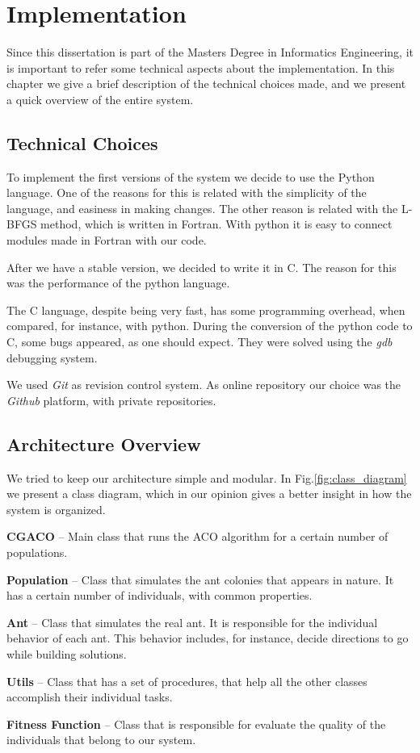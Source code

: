 \chapter{Implementation}

Since this dissertation is part of the Masters Degree in Informatics Engineering, it is important to refer some technical aspects about the implementation. In this chapter we give a brief description of the technical choices made, and we present a quick overview of the entire system.

\section{Technical Choices}

To implement the first versions of the system we decide to use the Python language. One of the reasons for this is related with the simplicity of the language, and easiness in making changes. The other reason is related with the L-BFGS method, which is written in Fortran. With python it is easy to connect modules made in Fortran with our code.

After we have a stable version, we decided to write it in C. The reason for this was the performance of the python language. 

The C language, despite being very fast, has some programming overhead, when compared, for instance, with python. During the conversion of the python code to C, some bugs appeared, as one should expect. They were solved using the \emph{gdb} debugging system.

We used \emph{Git} as revision control system. As online repository our choice was the \emph{Github} platform, with private repositories.

\section{Architecture Overview}
We tried to keep our architecture simple and modular. In Fig.\ref{fig:class_diagram} we present a class diagram, which in our opinion gives a better insight in how the system is organized.

\pagebreak
\textbf{CGACO} – Main class that runs the ACO algorithm for a certain number of populations.

\textbf{Population} – Class that simulates the ant colonies that appears in nature. It has a certain number of individuals, with common properties.

\textbf{Ant} – Class that simulates the real ant. It is responsible for the individual behavior of each ant. This behavior includes, for instance, decide directions to go while building solutions.

\textbf{Utils} – Class that has a set of procedures, that help all the other classes accomplish their individual tasks.

\textbf{Fitness Function} – Class that is responsible for evaluate the quality of the individuals that belong to our system.

